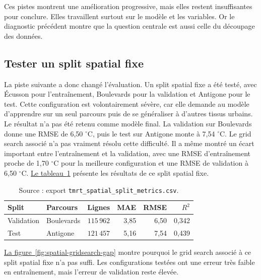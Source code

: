 \documentclass{article}
\begin{document}
Ces pistes montrent une amélioration progressive, mais elles restent insuffisantes pour conclure. Elles travaillent surtout sur le modèle et les variables. Or le diagnostic précédent montre que la question centrale est aussi celle du découpage des données.

\subsection{Tester un split spatial fixe}

La piste suivante a donc changé l'évaluation. Un split spatial fixe a été testé, avec Écusson pour l'entraînement, Boulevards pour la validation et Antigone pour le test. Cette configuration est volontairement sévère, car elle demande au modèle d'apprendre sur un seul parcours puis de se généraliser à d'autres tissus urbains.
Le résultat n'a pas été retenu comme modèle final. La validation sur Boulevards donne une RMSE de 6,50 \(^{\circ}\mathrm{C}\), puis le test sur Antigone monte à 7,54 \(^{\circ}\mathrm{C}\). Le grid search associé n'a pas vraiment résolu cette difficulté. Il a même montré un écart important entre l'entraînement et la validation, avec une RMSE d'entraînement proche de 1,70 \(^{\circ}\mathrm{C}\) pour la meilleure configuration et une RMSE de validation à 6,50 \(^{\circ}\mathrm{C}\).
\hyperref[tab:split-spatial-fixe]{Le tableau~\ref{tab:split-spatial-fixe}} présente les résultats de ce split spatial fixe.

\begin{table}[H]
\centering
\small
\begin{tabular}{llrrrr}
\toprule
Split & Parcours & Lignes & MAE & RMSE & \(R^2\) \\
\midrule
Validation & Boulevards & \(115\,962\) & 3,85 & 6,50 & 0,342 \\
Test & Antigone & \(121\,457\) & 5,16 & 7,54 & 0,439 \\
\bottomrule
\end{tabular}
\caption{Résultats du split spatial fixe avec \texttt{HistGradientBoostingRegressor}.}
\label{tab:split-spatial-fixe}
\vspace{-0.35cm}
\caption*{\footnotesize Source : export \texttt{tmrt\_spatial\_split\_metrics.csv}.}
\end{table}

\hyperref[fig:spatial-gridsearch-gap]{La figure~\ref{fig:spatial-gridsearch-gap}} montre pourquoi le grid search associé à ce split spatial fixe n'a pas suffi. Les configurations testées ont une erreur très faible en entraînement, mais l'erreur de validation reste élevée.
\end{document}
